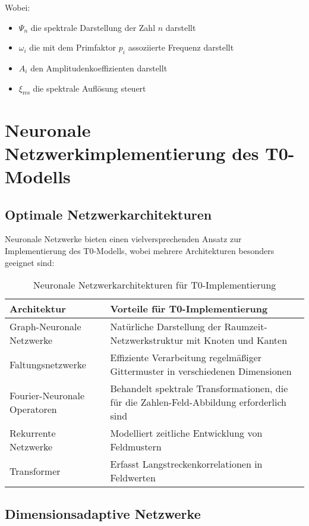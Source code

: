 \documentclass[12pt,a4paper]{article}
\newcommand{\xipar}{\ensuremath{\xi}}
\begin{document}
	Wobei:
	\begin{itemize}
		\item $\Psi_n$ die spektrale Darstellung der Zahl $n$ darstellt
		\item $\omega_i$ die mit dem Primfaktor $p_i$ assoziierte Frequenz darstellt
		\item $A_i$ den Amplitudenkoeffizienten darstellt
		\item $\xipar_{\text{res}}$ die spektrale Auflösung steuert
	\end{itemize}
	
	\section{Neuronale Netzwerkimplementierung des T0-Modells}
	\label{sec:neural_network}
	
	\subsection{Optimale Netzwerkarchitekturen}
	\label{subsec:optimal_architectures}
	
	Neuronale Netzwerke bieten einen vielversprechenden Ansatz zur Implementierung des T0-Modells, wobei mehrere Architekturen besonders geeignet sind:
	
	\begin{table}[htbp]
		\centering
		\begin{tabular}{lp{8cm}}
			\toprule
			\textbf{Architektur} & \textbf{Vorteile für T0-Implementierung} \\
			\midrule
			Graph-Neuronale Netzwerke & Natürliche Darstellung der Raumzeit-Netzwerkstruktur mit Knoten und Kanten \\
			Faltungsnetzwerke & Effiziente Verarbeitung regelmäßiger Gittermuster in verschiedenen Dimensionen \\
			Fourier-Neuronale Operatoren & Behandelt spektrale Transformationen, die für die Zahlen-Feld-Abbildung erforderlich sind \\
			Rekurrente Netzwerke & Modelliert zeitliche Entwicklung von Feldmustern \\
			Transformer & Erfasst Langstreckenkorrelationen in Feldwerten \\
			\bottomrule
		\end{tabular}
		\caption{Neuronale Netzwerkarchitekturen für T0-Implementierung}
		\label{tab:network_architectures}
	\end{table}
	
	\subsection{Dimensionsadaptive Netzwerke}
	\label{subsec:dimension_adaptive}
	
\end{document}
